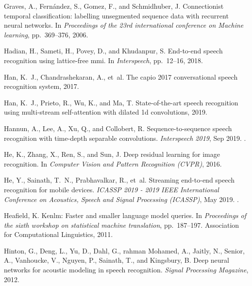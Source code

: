 \documentclass{article}
\begin{document}
\begin{thebibliography}{99}
Graves, A., Fern{\'a}ndez, S., Gomez, F., and Schmidhuber, J.
\newblock Connectionist temporal classification: labelling unsegmented sequence
  data with recurrent neural networks.
\newblock In \emph{Proceedings of the 23rd international conference on Machine
  learning}, pp.\  369--376, 2006.

Hadian, H., Sameti, H., Povey, D., and Khudanpur, S.
\newblock End-to-end speech recognition using lattice-free mmi.
\newblock In \emph{Interspeech}, pp.\  12--16, 2018.

Han, K.~J., Chandrashekaran, A., et~al.
\newblock The capio 2017 conversational speech recognition system, 2017.

Han, K.~J., Prieto, R., Wu, K., and Ma, T.
\newblock State-of-the-art speech recognition using multi-stream self-attention
  with dilated 1d convolutions, 2019.

Hannun, A., Lee, A., Xu, Q., and Collobert, R.
\newblock Sequence-to-sequence speech recognition with time-depth separable
  convolutions.
\newblock \emph{Interspeech 2019}, Sep 2019.
\newblock {}.

He, K., Zhang, X., Ren, S., and Sun, J.
\newblock Deep residual learning for image recognition.
\newblock In \emph{Computer Vision and Pattern Recognition (CVPR)}, 2016.

He, Y., Sainath, T.~N., Prabhavalkar, R., et~al.
\newblock Streaming end-to-end speech recognition for mobile devices.
\newblock \emph{ICASSP 2019 - 2019 IEEE International Conference on Acoustics,
  Speech and Signal Processing (ICASSP)}, May 2019.
\newblock {}.

Heafield, K.
\newblock Kenlm: Faster and smaller language model queries.
\newblock In \emph{Proceedings of the sixth workshop on statistical machine
  translation}, pp.\  187--197. Association for Computational Linguistics,
  2011.

Hinton, G., Deng, L., Yu, D., Dahl, G., rahman Mohamed, A., Jaitly, N., Senior,
  A., Vanhoucke, V., Nguyen, P., Sainath, T., and Kingsbury, B.
\newblock Deep neural networks for acoustic modeling in speech recognition.
\newblock \emph{Signal Processing Magazine}, 2012.


\end{thebibliography}
\end{document}
